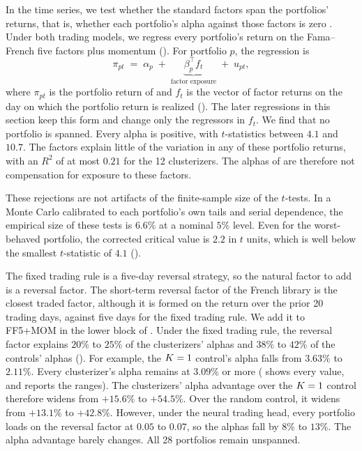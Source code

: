 In the time series, we test whether the standard factors span the portfolios' returns, that is, whether each portfolio's alpha against those factors is zero \citep{barillas2017alpha}. Under both trading models, we regress every portfolio's return on the Fama--French five factors \citep{fama2015five} plus momentum \citep{carhart1997persistence} (). For portfolio $p$, the regression is
%
\begin{equation}\label{eq:span}
  \pi_{pt} \;=\; \alpha_p \;+\; \underbrace{\beta_p^{\top} f_t}_{\text{factor exposure}} \;+\; u_{pt},
\end{equation}
%
where $\pi_{pt}$ is the portfolio return of  and $f_t$ is the vector of factor returns on the day on which the portfolio return is realized (). The later regressions in this section keep this form and change only the regressors in $f_t$. We find that no portfolio is spanned. Every alpha is positive, with $t$-statistics between $4.1$ and $10.7$. The factors explain little of the variation in any of these portfolio returns, with an $R^2$ of at most $0.21$ for the 12 clusterizers. The alphas of  are therefore not compensation for exposure to these factors.

These rejections are not artifacts of the finite-sample size of the $t$-tests. In a Monte Carlo calibrated to each portfolio's own tails and serial dependence, the empirical size of these tests is $6.6\%$ at a nominal $5\%$ level. Even for the worst-behaved portfolio, the corrected critical value is $2.2$ in $t$ units, which is well below the smallest $t$-statistic of $4.1$ ().

The fixed trading rule is a five-day reversal strategy, so the natural factor to add is a reversal factor. The short-term reversal factor of the French library is the closest traded factor, although it is formed on the return over the prior 20 trading days, against five days for the fixed trading rule. We add it to FF5+MOM in the lower block of . Under the fixed trading rule, the reversal factor explains $20\%$ to $25\%$ of the clusterizers' alphas and $38\%$ to $42\%$ of the controls' alphas (). For example, the $K=1$ control's alpha falls from $3.63\%$ to $2.11\%$. Every clusterizer's alpha remains at $3.09\%$ or more ( shows every value, and  reports the ranges). The clusterizers' alpha advantage over the $K=1$ control therefore widens from $+15.6\%$ to $+54.5\%$. Over the random control, it widens from $+13.1\%$ to $+42.8\%$. However, under the neural trading head, every portfolio loads on the reversal factor at $0.05$ to $0.07$, so the alphas fall by $8\%$ to $13\%$. The alpha advantage barely changes. All 28 portfolios remain unspanned.

